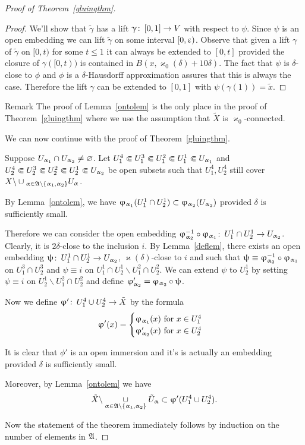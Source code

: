 \begin{proof}[Proof of Theorem~\ref{gluingthm}]
\begin{proof}
We'll  show that $\tilde{\gamma}$  has a lift $\gamma\co [0,1]\to V$ with respect to $\psi$. Since $\psi $ is an open embedding we can lift $\tilde{\gamma}$ on some interval $[0,\upvarepsilon)$. Observe that given a lift $\gamma$  of $\tilde{\gamma}$  on $[0,t)$ for some $t\le 1$  it can always be extended to $[0,t]$ provided the closure of $\gamma([0,t))$ is contained in $B(x,\varkappa_0(\delta)+10\delta)$. The fact that $\psi$ is $\delta$-close to $\phi$ and $\phi$ is a $\delta$-Hausdorff approximation assures that this is always the case. Therefore the lift $\gamma$ can be extended to $[0,1]$ with $\psi(\gamma(1))=\tilde{x}$.
\end{proof}

\begin{thm}{Remark}
The proof of Lemma~\ref{ontolem} is the only place in the proof of Theorem~\ref{gluingthm} where we use the assumption that $\tilde{X}$ is $\varkappa_0$-connected.
\end{thm}


We can now continue with the proof of Theorem~\ref{gluingthm}.

Suppose $U_{\a_1}\cap U_{\a_2}\ne \emptyset$. Let $U_1^4\Subset U_1^3\Subset U_1^2\Subset U_1^1\Subset U_{\upalpha_1}$ and 
$U_2^4\Subset U_2^3\Subset U_2^2\Subset U_2^1\Subset U_{\upalpha_2}$ be open subsets such that $U_1^4, U_2^4$ still cover
$X\backslash \cup_{\a\in \frak A\backslash\{\a_1,\a_2\}}U_\a$.

By Lemma~\ref{ontolem},  we have $\phi_{\a_1}(U_1^1\cap U_2^1)\subset \phi_{\a_2}(U_{\a_2})$ provided $\delta$ is sufficiently small.

Therefore we can consider the open embedding $\phi_{\a_2}^{-1}\circ \phi_{\a_1}\co U_1^1\cap U_2^1\to U_{\a_2}$. Clearly, it is $2\delta$-close to the inclusion $i$. By Lemma~\ref{deflem}, there exists an open embedding $\psi\co U_1^1\cap U_2^1\to U_{\a_2}$, $\varkappa(\delta)$-close to $i$ and such that $\psi\equiv \phi_{\a_2}^{-1}\circ \phi_{\a_1}$ on $U_1^3\cap U_2^3$ and $\psi\equiv i$ on $U_1^1\cap U_2^1\backslash U_1^2\cap U_2^2$. We can extend $\psi$ to $U_2^1$ by setting $\psi\equiv i$ on $U_2^1 \backslash  U_1^2\cap U_2^2$ and define $\phi_{\a_2}'=\phi_{\a_2}\circ\psi$.

Now we define $\phi'\co U_1^4\cup U_2^4\to\tilde{X}$ by the formula
\[
\phi'(x)=
\begin{cases}
\phi_{\a_1}(x) \text{ for } x\in U_1^4\\
\phi_{\a_2}'(x) \text{ for } x\in U_2^4
\end{cases}
\]

It is clear that $\phi'$ is an open immersion and it's is actually an embedding provided $\delta$ is sufficiently small.

Moreover, by Lemma~\ref{ontolem} we have 
\[\tilde{X}\backslash \underset{\a\in \frak A\backslash\{\a_1,\a_2\}}  { \cup}\tilde{U}_\a\subset \phi'(U_1^4\cup U_2^4).\]

 Now the statement of the theorem immediately follows by induction on the number of elements in $\frak A$.


\end{proof}


